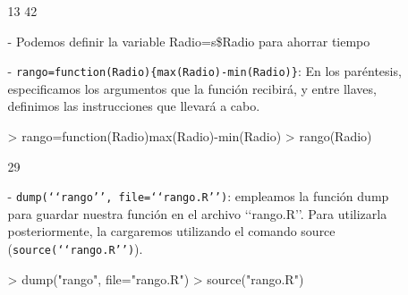 \documentclass[a4paper, 12pt]{article}
\begin{document}
\begin{itemize}
\begin{itemize}
\begin{Schunk}
\begin{Soutput}
[1] 13 42
\end{Soutput}
\end{Schunk}
			\item[-] Podemos definir la variable Radio=s\$Radio para ahorrar tiempo
\begin{Schunk}
\end{Schunk}
			\item[-] \texttt{rango=function(Radio)\{max(Radio)-min(Radio)\}}: En los paréntesis, especificamos los argumentos que la función recibirá, y entre llaves, definimos las instrucciones que llevará a cabo.
\begin{Schunk}
\begin{Sinput}
> rango=function(Radio){max(Radio)-min(Radio)}
> rango(Radio)
\end{Sinput}
\begin{Soutput}
[1] 29
\end{Soutput}
\end{Schunk}
			\item[-] \texttt{dump(‘‘rango’’, file=‘‘rango.R’’)}: empleamos la función dump para guardar nuestra función en el archivo ‘‘rango.R’’. Para utilizarla posteriormente, la cargaremos utilizando el comando source (\texttt{source(‘‘rango.R’’)}).
\begin{Schunk}
\begin{Sinput}
> dump("rango", file="rango.R")
> source("rango.R")
\end{Sinput}
\end{Schunk}
		\end{itemize}
		\newpage
		

\end{itemize}
\end{document}
